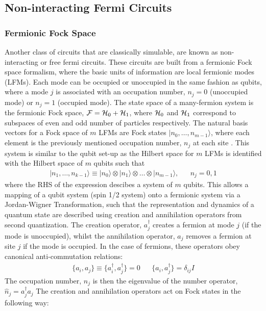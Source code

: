 \subsection{Non-interacting Fermi Circuits}
\subsubsection{Fermionic Fock Space}
Another class of circuits that are classically simulable, are known as non-interacting or free fermi circuits.
These circuits are built from a fermionic Fock space formalism, where the basic units of information are local
fermionic modes (LFMs). Each mode can be occupied or unoccupied in the same fashion as qubits, where
a mode $j$ is associated with an occupation number, $n_j = 0$ (unoccupied mode) or $n_j = 1$ (occupied mode).
The state space of a many-fermion system is the fermionic Fock space, ${\cal F} = {\cal H}_0 + {\cal H}_1$,
where ${\cal H}_0$ and ${\cal H}_1$ correspond to subspaces of even and odd number of particles respectively.
The natural basis vectors for a Fock space of $m$ LFMs are Fock states $|n_0, \dots, n_{m-1}\rangle$,
where each element is the previously mentioned occupation number, $n_j$ at each site \cite{DeFelice2019}.
This system is similar to the qubit set-up as the Hilbert space for $m$ LFMs is identified with the Hilbert space
of $m$ qubits such that
\begin{align*}
    |n_1, \dots, n_{k-1}\rangle \equiv | n_0 \rangle \otimes | n_1 \rangle \otimes \dots \otimes | n_{m-1} \rangle, &  & n_j = 0,1
\end{align*}
where the RHS of the expression descibes a system of $m$ qubits. This allows a mapping of a qubit system (spin 1/2 system) onto
a fermionic system via a Jordan-Wigner Transformation, such that the representation and dynamics of a quantum
state are described using creation and annihilation operators from second quantization.
The creation operator, $a_j^{\dagger}$ creates a fermion at mode $j$ (if the mode is unoccupied),
whilst the annihilation operator, $a_j$ removes a fermion at site $j$ if the mode is occupied.
In the case of fermions, these operators obey canonical anti-commutation relations:
\begin{align}
    \{a_i, a_j\} \equiv \{a_i^{\dagger}, a_j^{\dagger}\} = 0 &  & \{a_i, a_j^{\dagger}\} = \delta_{ij}I
\end{align}
The occupation number, $n_j$ is then the eigenvalue of the number operator, $\hat{n}_j = a^{\dagger}_j a_j$
The creation and annihilation operators act on Fock states in the following way:
